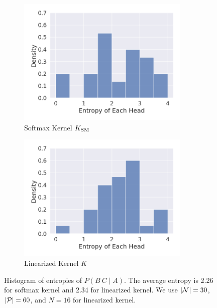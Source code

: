 \documentclass{article}
\begin{document}
\begin{figure}[!tp]
  \centering
  \begin{subfigure}[t]{0.45\textwidth}
  \centering
  \includegraphics[width=0.9\textwidth]{imgs/softmax/entropy.png}
  \caption{Softmax Kernel $K_{\mathrm{SM}}$}
  \end{subfigure}
  \begin{subfigure}[t]{0.45\textwidth}
  \centering
  \includegraphics[width=0.9\textwidth]{imgs/rff/entropy.png}
  \caption{Linearized Kernel $K$}
  \end{subfigure}
  \caption{\label{fig:example_production}Histogram of entropies of $P(B\ C\mid A)$. The average entropy is 2.26 for softmax kernel and 2.34 for linearized kernel. We use $|\mathcal{N}|=30$, $|\mathcal{P}|=60$, and $N=16$ for linearized kernel.}
\end{figure}
\end{document}
